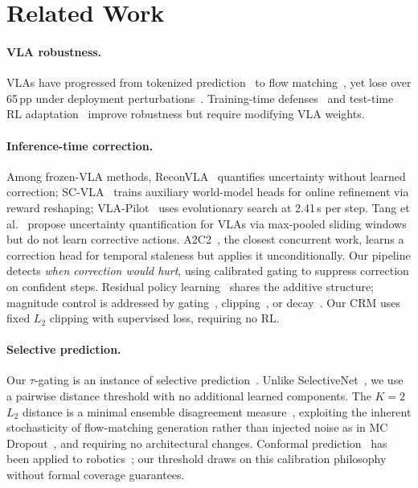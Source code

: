 \section{Related Work}\label{sec:related_work}

\paragraph{VLA robustness.} VLAs have progressed from tokenized prediction~\cite{brohan2023rt2,kim2024openvla,ghosh2024octo} to flow matching~\cite{black2024pi0,shukor2025smolvla}, yet lose over 65\,pp under deployment perturbations~\cite{fei2025liberoplus}. Training-time defenses~\cite{srpo2025,robustvla2025,digflow2025} and test-time RL adaptation~\cite{liu2026ttvla} improve robustness but require modifying VLA weights.

\paragraph{Inference-time correction.} Among frozen-VLA methods, ReconVLA~\cite{chen2026reconvla} quantifies uncertainty without learned correction; SC-VLA~\cite{liu2026scvla} trains auxiliary world-model heads for online refinement via reward reshaping; VLA-Pilot~\cite{li2025vlapilot} uses evolutionary search at 2.41\,s per step. Tang et al.~\cite{tang2026shifting} propose uncertainty quantification for VLAs via max-pooled sliding windows but do not learn corrective actions. A2C2~\cite{a2c2_2025}, the closest concurrent work, learns a correction head for temporal staleness but applies it unconditionally. Our pipeline detects \emph{when correction would hurt}, using calibrated gating to suppress correction on confident steps. Residual policy learning~\cite{silver2018residual,johannink2019residual} shares the additive structure; magnitude control is addressed by gating~\cite{jiang2024transic}, clipping~\cite{xiao2026pld}, or decay~\cite{pan2025drc}. Our CRM uses fixed $L_2$ clipping with supervised loss, requiring no RL.

\paragraph{Selective prediction.} Our $\tau$-gating is an instance of selective prediction~\cite{chow1970optimum,elyaniv2010selective,geifman2017selective}. Unlike SelectiveNet~\cite{geifman2019selectivenet}, we use a pairwise distance threshold with no additional learned components. The $K{=}2$ $L_2$ distance is a minimal ensemble disagreement measure~\cite{lakshminarayanan2017simple}, exploiting the inherent stochasticity of flow-matching generation rather than injected noise as in MC Dropout~\cite{gal2016dropout}, and requiring no architectural changes. Conformal prediction~\cite{angelopoulos2023gentle} has been applied to robotics~\cite{lindemann2023safe,zhao2024conformalized,yao2025cpnav}; our threshold draws on this calibration philosophy without formal coverage guarantees.

